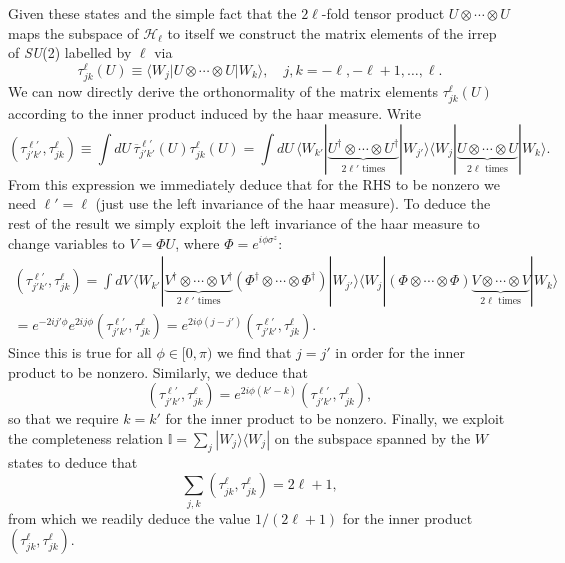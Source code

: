 \documentclass[12pt]{amsart}
\def\su2{\textsl{SU}(2)}
\theoremstyle{definition}
\theoremstyle{remark}
\numberwithin{equation}{section}
\begin{document}
Given these states and the simple fact that the $2\ell$-fold tensor product $U\otimes \cdots \otimes U$ maps the subspace of $\mathcal{H}_\ell$ to itself we construct the matrix elements of the irrep of \su2 labelled by $\ell$ via
\begin{equation}
	\tau_{jk}^\ell(U) \equiv \langle W_j| U\otimes \cdots \otimes U |W_k\rangle, \quad j,k = -\ell, -\ell+1, \ldots, \ell.
\end{equation}
We can now directly derive the orthonormality of the matrix elements $\tau_{jk}^\ell(U)$ according to the inner product induced by the haar measure. Write
\begin{equation}
		({\tau}^{\ell'}_{j'k'}, {\tau}^{\ell}_{jk}) \equiv \int dU\,\overline{\tau}^{\ell'}_{j'k'}(U){\tau}^{\ell}_{jk}(U) = \int dU\, \langle W_{k'}| \underbrace{U^\dag \otimes \cdots \otimes U^\dag}_{\text{$2\ell'$ times}}  |W_{j'}\rangle \langle W_j| \underbrace{U\otimes \cdots \otimes U}_{\text{$2\ell$ times}} |W_k\rangle.
\end{equation}
From this expression we immediately deduce that for the RHS to be nonzero we need $\ell' = \ell$ (just use the left invariance of the haar measure). To deduce the rest of the result we simply exploit the left invariance of the haar measure to change variables to $V = \Phi U$, where $\Phi = e^{i\phi \sigma^z}$:
\begin{multline}
		({\tau}^{\ell'}_{j'k'}, {\tau}^{\ell}_{jk}) = \int dV\, \langle W_{k'}| \underbrace{V^\dag \otimes \cdots \otimes V^\dag}_{\text{$2\ell'$ times}}  (\Phi^\dag\otimes \cdots \otimes \Phi^\dag)|W_{j'}\rangle \langle W_j|(\Phi\otimes \cdots \otimes \Phi) \underbrace{V\otimes \cdots \otimes V}_{\text{$2\ell$ times}} |W_k\rangle \\ = e^{-2i j'\phi }e^{2ij\phi} ({\tau}^{\ell'}_{j'k'}, {\tau}^{\ell}_{jk}) = e^{2i\phi (j-j')} ({\tau}^{\ell'}_{j'k'}, {\tau}^{\ell}_{jk}).
\end{multline}
Since this is true for all $\phi \in [0, \pi)$ we find that $j=j'$ in order for the inner product to be nonzero.
Similarly, we deduce that
\begin{equation}
	({\tau}^{\ell'}_{j'k'}, {\tau}^{\ell}_{jk}) = e^{2i\phi (k'-k)} ({\tau}^{\ell'}_{j'k'}, {\tau}^{\ell}_{jk}),
\end{equation}
so that we require $k = k'$ for the inner product to be nonzero. Finally, we exploit the completeness relation $\mathbb{I} = \sum_{j} |W_j\rangle \langle W_j|$ on the subspace spanned by the $W$ states to deduce that
\begin{equation}
	\sum_{j,k} ({\tau}^{\ell}_{jk}, {\tau}^{\ell}_{jk}) = 2\ell+1,
\end{equation} 
from which we readily deduce the value $1/(2\ell + 1)$ for the inner product $({\tau}^{\ell}_{jk}, {\tau}^{\ell}_{jk})$.
\end{document}
